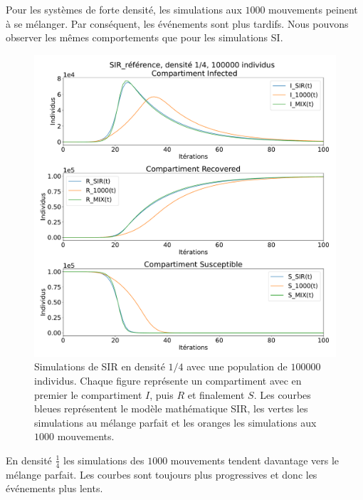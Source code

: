 Pour les systèmes de forte densité, les simulations aux $1000$ mouvements peinent à se mélanger. Par conséquent, les événements sont plus tardifs. Nous pouvons observer les mêmes comportements que pour les simulations SI.

\newpage

\begin{figure}[h]
	\centering
	\captionsetup{justification=centering}
	\includegraphics[width=.9\textwidth]{Images/SIR_ref_4_100.pdf}
	\caption[Simulation SIR, densité $1/4$]{Simulations de SIR en densité $1/4$ avec une population de $100000$ individus. Chaque figure représente un compartiment avec en premier le compartiment $I$, puis $R$ et finalement $S$. Les courbes bleues représentent le modèle mathématique SIR, les vertes les simulations au mélange parfait et les oranges les simulations aux $1000$ mouvements.}
\end{figure}

En densité $\frac{1}{4}$ les simulations des $1000$ mouvements tendent davantage vers le mélange parfait. Les courbes sont toujours plus progressives et donc les événements plus lents.

\newpage

